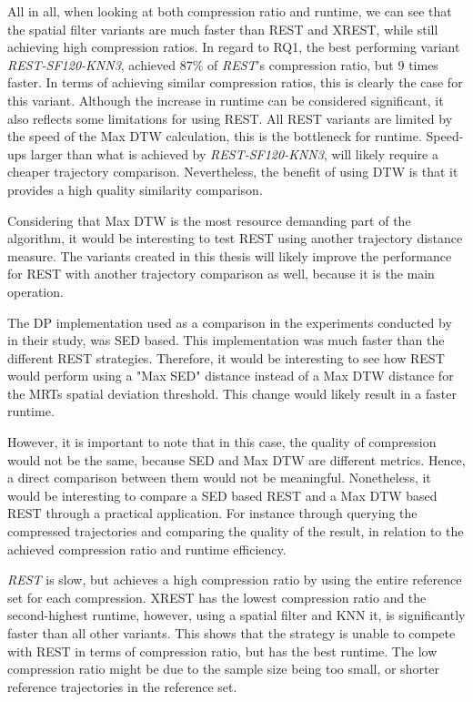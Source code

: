 All in all, when looking at both compression ratio and runtime, we can see that the spatial filter variants are much faster than REST and XREST, while still achieving high compression ratios. In regard to RQ1, the best performing variant \textit{REST-SF120-KNN3}, achieved 87\% of \textit{REST}'s compression ratio, but 9 times faster. In terms of achieving similar compression ratios, this is clearly the case for this variant. Although the increase in runtime can be considered significant, it also reflects some limitations for using REST. All REST variants are limited by the speed of the Max DTW calculation, this is the bottleneck for runtime. Speed-ups larger than what is achieved by \textit{REST-SF120-KNN3}, will likely require a cheaper trajectory comparison. Nevertheless, the benefit of using DTW is that it provides a high quality similarity comparison.

Considering that Max DTW is the most resource demanding part of the algorithm, it would be interesting to test REST using another trajectory distance measure. The variants created in this thesis will likely improve the performance for REST with another trajectory comparison as well, because it is the main operation.

The DP implementation used as a comparison in the experiments conducted by \textcite{zhao2018rest} in their study, was SED based. This implementation was much faster than the different REST strategies. Therefore, it would be interesting to see how REST would perform using a "Max SED" distance instead of a Max DTW distance for the MRTs spatial deviation threshold. This change would likely result in a faster runtime.

However, it is important to note that in this case, the quality of compression would not be the same, because SED and Max DTW are different metrics. Hence, a direct comparison between them would not be meaningful. Nonetheless, it would be interesting to compare a SED based REST and a Max DTW based REST through a practical application. For instance through querying the compressed trajectories and comparing the quality of the result, in relation to the achieved compression ratio and runtime efficiency.

\textit{REST} is slow, but achieves a high compression ratio by using the entire reference set for each compression. XREST has the lowest compression ratio and the second-highest runtime, however, using a spatial filter and KNN it, is significantly faster than all other variants. This shows that the strategy is unable to compete with REST in terms of compression ratio, but has the best runtime. The low compression ratio might be due to the sample size being too small, or shorter reference trajectories in the reference set.

